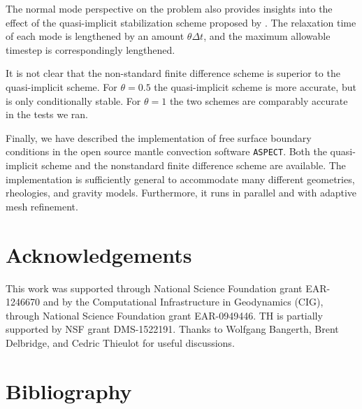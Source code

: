 \documentclass[preprint,12pt,authoryear]{elsarticle}
\begin{document}
The normal mode perspective on the problem also provides insights into the effect of 
the quasi-implicit stabilization scheme proposed by \citet{kaus2010stabilization}.
The relaxation time of each mode is lengthened by an amount $\theta \Delta t$, and the
maximum allowable timestep is correspondingly lengthened.

It is not clear that the non-standard finite difference scheme is superior to 
the quasi-implicit scheme. For $\theta=0.5$ the quasi-implicit scheme is more accurate,
but is only conditionally stable. For $\theta=1$ the two schemes are comparably accurate 
in the tests we ran.

Finally, we have described the implementation of free surface boundary conditions in 
the open source mantle convection software \texttt{ASPECT}. Both the quasi-implicit 
scheme and the nonstandard finite difference scheme are available. The implementation is 
sufficiently general to accommodate many different geometries, rheologies, and 
gravity models. Furthermore, it runs in parallel and with adaptive mesh refinement.


\section*{Acknowledgements}
This work was supported through National Science Foundation grant EAR-1246670
and by the Computational Infrastructure in Geodynamics (CIG), through National Science Foundation grant EAR-0949446. 
TH is partially supported by NSF grant DMS-1522191.
Thanks to Wolfgang Bangerth, Brent Delbridge, and Cedric Thieulot for useful discussions.


\section*{Bibliography}
 






\end{document}
